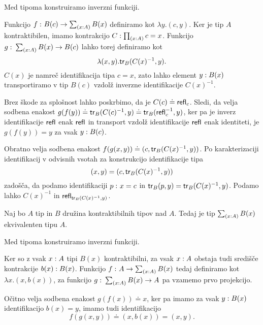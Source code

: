 \begin{dokaz}
  Med tipoma konstruiramo inverzni funkciji.

  Funkcijo \(f \,\colon B(c) \to \textstyle \sum_{\left( x : A \right)} B(x)\) definiramo kot \(\lambda y. (c, y)\). Ker je tip \(A\) kontraktibilen, imamo kontrakcijo \(C : \textstyle \prod_{\left( x : A \right)} c = x\).
  Funkcijo \(g \,\colon \textstyle \sum_{\left( x : A \right)} B(x) \to B(c)\) lahko torej definiramo kot
  \[\lambda (x, y).\textnormal{\textsf{tr}}_{B}(C(x)^{-1}, y).\]  \(C(x)\) je namreč identifikacija tipa \(c = x\), zato lahko element \(y : B(x)\) transportiramo v tip \(B(c)\) vzdolž inverzne identifikacije \(C(x)^{-1}\).

  Brez škode za splošnost lahko poskrbimo, da je \(C(c) \doteq \textnormal{\textsf{refl}}_{c}\). Sledi, da velja sodbena enakost \(g(f(y)) \doteq \textnormal{\textsf{tr}}_{B}(C(c)^{-1}, y) \doteq \textnormal{\textsf{tr}}_{B}(\textnormal{\textsf{refl}}_{c}^{-1}, y)\),  ker pa je inverz identifikacije \(\textnormal{\textsf{refl}}_{}\) enak \(\textnormal{\textsf{refl}}_{}\) in transport vzdolž identifikacije \(\textnormal{\textsf{refl}}_{}\) enak identiteti, je \(g(f(y)) = y\) za vsak \(y : B(c)\).

  Obratno velja sodbena enakost \(f(g(x, y)) \doteq (c, \textnormal{\textsf{tr}}_{B}(C(x)^{-1}, y))\). Po karakterizaciji identifikacij v odvisnih vsotah za konstrukcijo identifikacije tipa
  \[(x, y) = (c, \textnormal{\textsf{tr}}_{B}(C(x)^{-1}, y))\] zadošča, da podamo identifikaciji \(p \,\colon x = c\) in \(\textnormal{\textsf{tr}}_{B}(p, y) = \textnormal{\textsf{tr}}_{B}(C(x)^{-1}, y)\). Podamo lahko \(C(x)^{-1}\) in \(\textnormal{\textsf{refl}}_{\textnormal{\textsf{tr}}_{B}(C(x)^{-1}, y)}\).
\end{dokaz}

\begin{trditev}
  \label{sigma-contr-fam}
  Naj bo \(A\) tip in \(B\) družina kontraktibilnih tipov nad \(A\). Tedaj je tip \(\textstyle \sum_{\left( x : A \right)} B(x)\) ekvivalenten tipu \(A\).
\end{trditev}

\begin{dokaz}
  Med tipoma konstruiramo inverzni funkciji.

  Ker so z vsak \(x : A\) tipi \(B(x)\) kontraktibilni, za vsak \(x : A\) obstaja tudi središče kontrakcije \(b(x) : B(x)\).
  Funkcijo \(f \,\colon A \to \textstyle \sum_{\left( x : A \right)} B(x)\) tedaj definiramo kot \(\lambda x. (x, b(x))\), za funkcijo \(g \,\colon \textstyle \sum_{\left( x : A \right)} B(x) \to A\) pa vzamemo prvo projekcijo.

  Očitno velja sodbena enakost \(g(f(x)) \doteq x\), ker pa imamo za vsak \(y : B(x)\) identifikacijo \(b(x) = y\), imamo tudi identifikacijo
  \[f(g(x, y)) \doteq (x, b(x)) = (x, y).\]
\end{dokaz}

